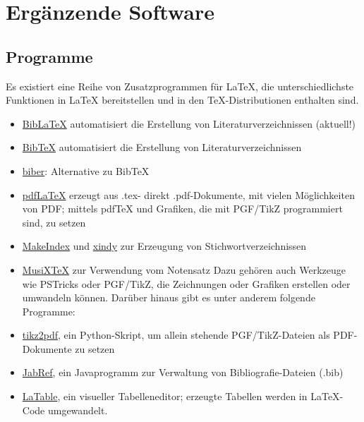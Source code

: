 
\chapter{Ergänzende Software}
\section{Programme}
Es existiert eine Reihe von Zusatzprogrammen für LaTeX, die unterschiedlichste Funktionen in LaTeX bereitstellen und in den TeX-Distributionen enthalten sind.
\begin{itemize}
	\item \href{https://de.wikipedia.org/w/index.php?title=BibLaTeX&action=edit&redlink=1}{BibLaTeX} automatisiert die Erstellung von Literaturverzeichnissen (aktuell!)
	\item \href{https://de.wikipedia.org/wiki/BibTeX}{BibTeX} automatisiert die Erstellung von Literaturverzeichnissen
	\item \href{https://de.wikipedia.org/w/index.php?title=Biber_(Software)&action=edit&redlink=1}{biber}: Alternative zu BibTeX
	\item \href{https://de.wikipedia.org/wiki/PdfLaTeX}{pdfLaTeX} erzeugt aus .tex- direkt .pdf-Dokumente, mit vielen Möglichkeiten von PDF; mittels pdfTeX und Grafiken, die mit PGF/TikZ programmiert sind, zu setzen
	\item \href{https://de.wikipedia.org/wiki/MakeIndex}{MakeIndex} und \href{https://de.wikipedia.org/w/index.php?title=Xindy&action=edit&redlink=1}{xindy} zur Erzeugung von Stichwortverzeichnissen
	\item \href{https://de.wikipedia.org/wiki/MusiXTeX}{MusiXTeX} zur Verwendung vom Notensatz
	Dazu gehören auch Werkzeuge wie PSTricks oder PGF/TikZ, die Zeichnungen oder Grafiken erstellen oder umwandeln können. Darüber hinaus gibt es unter anderem folgende Programme:
	\item \href{https://de.wikipedia.org/w/index.php?title=Tikz2pdf&action=edit&redlink=1}{tikz2pdf}, ein Python-Skript, um allein stehende PGF/TikZ-Dateien als PDF-Dokumente zu setzen
	\item \href{https://de.wikipedia.org/wiki/JabRef}{JabRef}, ein Javaprogramm zur Verwaltung von Bibliografie-Dateien (.bib)
	\item \href{https://de.wikipedia.org/w/index.php?title=LaTable&action=edit&redlink=1}{LaTable}, ein visueller Tabelleneditor; erzeugte Tabellen werden in LaTeX-Code umgewandelt.
	
\end{itemize}

